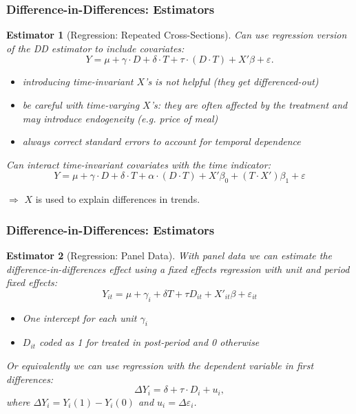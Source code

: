 \documentclass{beamer}
\numberwithin{equation}{section}
\newtheorem{esti}{Estimator}
\begin{document}
\begin{frame}
  \frametitle{Difference-in-Differences: Estimators}

\begin{esti}[Regression: Repeated Cross-Sections]\small
Can use regression version of the DD estimator
to include covariates:
\[
Y = \mu + \gamma\cdot D + \delta\cdot T + \tau \cdot (D\cdot T) + X'\beta + \varepsilon.
\]\vspace*{-0.5cm}
\begin{itemize}
\item introducing time-invariant   $X$'s is not helpful (they get differenced-out)
\item be careful with time-varying $X$'s: they are often affected by the treatment and may introduce endogeneity (e.g. price of meal)
\item always correct standard errors to account for temporal dependence
\end{itemize}
Can interact time-invariant
covariates with the time indicator:
\begin{equation}
Y = \mu + \gamma\cdot D + \delta\cdot T + \alpha\cdot (D\cdot T) + X'\beta_0 + (T\cdot X')\beta_1   +\varepsilon \nonumber
\end{equation}
\end{esti}
$\Rightarrow$ $X$ is used to explain differences in trends.
\end{frame}

\begin{frame}
  \frametitle{Difference-in-Differences: Estimators}


\begin{esti}[Regression: Panel Data]\small

With panel data we can estimate the difference-in-differences effect using a fixed effects regression with unit and  period fixed effects:
\[
Y_{it} = \mu + \gamma_i + \delta T + \tau D_{it} + X'_{it}\beta + \varepsilon_{it}
\]\vspace*{-0.5cm}

\begin{itemize}
\item One intercept for each unit $\gamma_i$
\item $D_{it}$ coded as 1 for treated in post-period and 0 otherwise
\end{itemize}

Or equivalently we can use regression with the dependent variable in first differences:
\[
\Delta Y_i = \delta + \tau \cdot D_i + u_i,
\]
where $\Delta Y_i = Y_i(1)-Y_i(0)$ and $u_i=\Delta \varepsilon_i$.\\\bigskip
\end{esti}
\end{frame}
\end{document}
